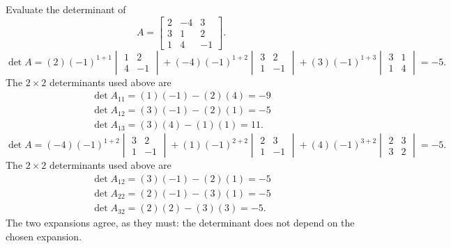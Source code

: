 \goal Evaluate the determinant of
\[A=\begin{bmatrix}2&-4&3\\3&1&2\\1&4&-1\end{bmatrix}.\]
\[
\det A=(2)(-1)^{1+1}\begin{vmatrix}1&2\\4&-1\end{vmatrix} + (-4)(-1)^{1+2}\begin{vmatrix}3&2\\1&-1\end{vmatrix} + (3)(-1)^{1+3}\begin{vmatrix}3&1\\1&4\end{vmatrix}=-5.
\]
The $2\times2$ determinants used above are
\[
\begin{gathered}\det A_{11}=(1)(-1)-(2)(4)=-9\\\det A_{12}=(3)(-1)-(2)(1)=-5\\\det A_{13}=(3)(4)-(1)(1)=11.\end{gathered}
\]
\[
\det A=(-4)(-1)^{1+2}\begin{vmatrix}3&2\\1&-1\end{vmatrix} + (1)(-1)^{2+2}\begin{vmatrix}2&3\\1&-1\end{vmatrix} + (4)(-1)^{3+2}\begin{vmatrix}2&3\\3&2\end{vmatrix}=-5.
\]
The $2\times2$ determinants used above are
\[
\begin{gathered}\det A_{12}=(3)(-1)-(2)(1)=-5\\\det A_{22}=(2)(-1)-(3)(1)=-5\\\det A_{32}=(2)(2)-(3)(3)=-5.\end{gathered}
\]
The two expansions agree, as they must: the determinant does not depend on the chosen expansion.

